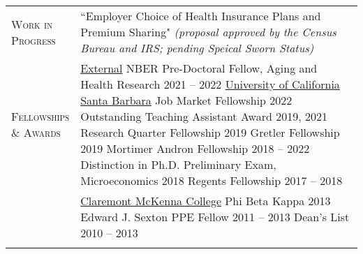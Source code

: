 \documentclass[11pt]{article}
\begin{document}
\begin{tabularx}{\textwidth}{@{}Y Z@{}}
    \textsc{Work in \newline Progress}  & 
    ``Employer Choice of Health Insurance Plans and Premium Sharing" \newline
    \textit{(proposal approved by the Census Bureau and IRS; pending Speical Sworn Status)} 
     \\ \addlinespace[20pt]

	\textsc{Fellowships \newline \& Awards} & 
	\uline{External}
	\vspace{3pt} \newline
	NBER Pre-Doctoral Fellow, Aging and Health Research \hfill 2021 -- 2022
	\vspace{15pt} \newline
	\uline{University of California Santa Barbara}
	\vspace{3pt} \newline
	Job Market Fellowship \hfill 2022
	\vspace{3pt} \newline
	Outstanding Teaching Assistant Award \hfill 2019, 2021
	\vspace{3pt} \newline
	Research Quarter Fellowship \hfill 2019
	\vspace{3pt} \newline
	Gretler Fellowship \hfill 2019
	\vspace{3pt} \newline
	Mortimer Andron Fellowship \hfill 2018 -- 2022
	\vspace{3pt} \newline 
	Distinction in Ph.D. Preliminary Exam, Microeconomics \hfill 2018
	\vspace{3pt} \newline
	Regents Fellowship \hfill 2017 -- 2018
	\vspace{0pt}
	\\ \newpage &
	\uline{Claremont McKenna College}
	\vspace{3pt} \newline
	Phi Beta Kappa \hfill 2013
	\vspace{3pt} \newline
	Edward J. Sexton PPE Fellow \hfill 2011 -- 2013
	\vspace{3pt} \newline
	Dean's List \hfill 2010 -- 2013
	\vspace{0pt}
	 \\ \addlinespace[20pt] 
	


\end{tabularx}
\end{document}
